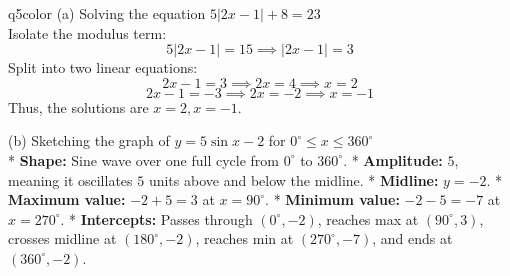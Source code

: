 \documentclass[11pt,a4paper]{article}
\begin{document}
\begin{ansbox}{q5color}
(a) Solving the equation $5\lvert 2x - 1 \rvert + 8 = 23$\\[4pt]
Isolate the modulus term:
\[
5\lvert 2x - 1 \rvert = 15 \implies \lvert 2x - 1 \rvert = 3
\]
Split into two linear equations:
\[
2x - 1 = 3 \implies 2x = 4 \implies x = 2
\]
\[
2x - 1 = -3 \implies 2x = -2 \implies x = -1
\]
Thus, the solutions are $\boxed{x = 2, x = -1}$.

(b) Sketching the graph of $y = 5\sin x - 2$ for $0^\circ \le x \le 360^\circ$\\[4pt]
* \textbf{Shape:} Sine wave over one full cycle from $0^\circ$ to $360^\circ$.
* \textbf{Amplitude:} $5$, meaning it oscillates $5$ units above and below the midline.
* \textbf{Midline:} $y = -2$.
* \textbf{Maximum value:} $-2 + 5 = 3$ at $x = 90^\circ$.
* \textbf{Minimum value:} $-2 - 5 = -7$ at $x = 270^\circ$.
* \textbf{Intercepts:} Passes through $(0^\circ, -2)$, reaches max at $(90^\circ, 3)$, crosses midline at $(180^\circ, -2)$, reaches min at $(270^\circ, -7)$, and ends at $(360^\circ, -2)$.
\end{ansbox}
\end{document}
